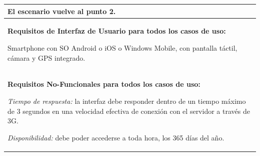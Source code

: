\begin{longtable}{|l|p{5.5cm}|l|p{2cm}|l|p{1.9cm}|}
{					El escenario vuelve al punto 2.

					} \\ \hline

					\multicolumn{6}{|p{15cm}|}{ \textbf{Requisitos de Interfaz de Usuario para todos los casos de uso: }

					Smartphone con SO Android o iOS o Windows Mobile, con pantalla táctil, cámara y GPS integrado.
					
					} \\ \hline

					\multicolumn{6}{|p{15cm}|}{ \textbf{Requisitos No-Funcionales para todos los casos de uso: }

					\emph{Tiempo de respuesta:} la interfaz debe responder dentro de un tiempo máximo de 3 segundos en una velocidad efectiva de conexión con el servidor a través de 3G.

					\emph{Disponibilidad:} debe poder accederse a toda hora, los 365 días del año.

					} \\ \hline

			\end{longtable}



